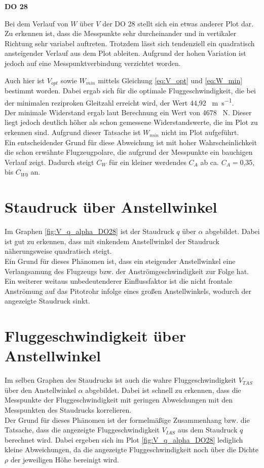 \textbf{DO 28}

Bei dem Verlauf von $W$ über $V$ der DO 28 stellt sich ein etwas anderer Plot dar. Zu erkennen ist, dass die Messpunkte sehr durcheinander und in vertikaler Richtung sehr variabel auftreten. Trotzdem lässt sich tendenziell ein quadratisch ansteigender Verlauf aus dem Plot ableiten. Aufgrund der hohen Variation ist jedoch auf eine Messpunktverbindung verzichtet worden.

Auch hier ist $V_{opt}$ sowie $W_{min}$ mittels Gleichung \ref{eq:V_opt} und \ref{eq:W_min} bestimmt worden. Dabei ergab sich für die optimale Fluggeschwindigkeit, die bei der minimalen reziproken Gleitzahl erreicht wird, der Wert 44,92 \SI{}{\meter\per\second}. \\ Der minimale Widerstand ergab laut Berechnung ein Wert von 4678 \SI{}{\newton}. Dieser liegt jedoch deutlich höher als schon gemessene Widerstandswerte, die im Plot zu erkennen sind. Aufgrund dieser Tatsache ist $W_{min}$ nicht im Plot aufgeführt. \\
Ein entscheidender Grund für diese Abweichung ist mit hoher Wahrscheinlichkeit die schon erwähnte Flugzeugpolare, die aufgrund der Messpunkte ein bauchigen Verlauf zeigt. Dadurch steigt $C_W$ für ein kleiner werdendes $C_A$ ab ca. $C_A=$0,35, bis $C_{W0}$ an.

\section{Staudruck über Anstellwinkel}

Im Graphen \ref{fig:V_q_alpha_DO28} ist der Staudruck $q$ über $\alpha$ abgebildet. Dabei ist gut zu erkennen, dass mit sinkendem Anstellwinkel der Staudruck näherungsweise quadratisch steigt. \\
Ein Grund für dieses Phänomen ist, dass ein steigender Anstellwinkel eine Verlangsamung des Flugzeugs bzw. der Anströmgeschwindigkeit zur Folge hat. Ein weiterer weitaus unbedeutenderer Einflussfaktor ist die nicht frontale Anströmung auf das Pitotrohr infolge eines großen Anstellwinkels, wodurch der angezeigte Staudruck sinkt.

\section{Fluggeschwindigkeit über Anstellwinkel}

Im selben Graphen des Staudrucks ist auch die wahre Fluggeschwindigkeit $V_{TAS}$ über den Anstellwinkel $\alpha$ abgebildet. Dabei ist schnell zu erkennen, dass die Messpunkte der Fluggeschwindigkeit mit geringen Abweichungen mit den Messpunkten des Staudrucks korrelieren. \\
Der Grund für dieses Phänomen ist der formelmäßige Zusammenhang bzw. die Tatsache, dass die angezeigte Fluggeschwindigkeit $V_{IAS}$ aus dem Staudruck $q$ berechnet wird. Dabei ergeben sich im Plot \ref{fig:V_q_alpha_DO28} lediglich kleine Abweichungen, da die angezeigte Fluggeschwindigkeit noch über die Dichte $\rho$ der jeweiligen Höhe bereinigt wird.

